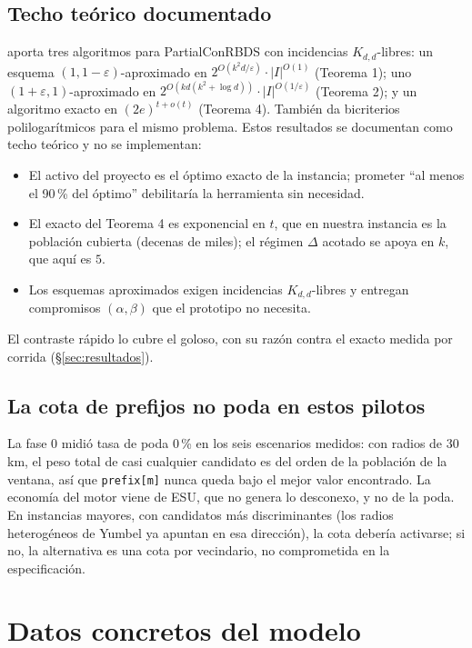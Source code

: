 \documentclass[12pt,letterpaper]{article}
\begin{document}
\subsection{Techo teórico documentado}
\label{sec:techo}
\cite{itcs2026} aporta tres algoritmos para PartialConRBDS con incidencias $K_{d,d}$-libres: un esquema $(1, 1-\varepsilon)$-aproximado en $2^{O(k^2 d/\varepsilon)} \cdot |I|^{O(1)}$ (Teorema 1); uno $(1+\varepsilon, 1)$-aproximado en $2^{O(kd(k^2+\log d))} \cdot |I|^{O(1/\varepsilon)}$ (Teorema 2); y un algoritmo exacto en $(2e)^{t+o(t)}$ (Teorema 4). También \cite{dangelo2025} da bicriterios polilogarítmicos para el mismo problema. Estos resultados se documentan como techo teórico y no se implementan:
\begin{itemize}
\item El activo del proyecto es el óptimo exacto de la instancia; prometer ``al menos el 90\,\% del óptimo'' debilitaría la herramienta sin necesidad.
\item El exacto del Teorema 4 es exponencial en $t$, que en nuestra instancia es la población cubierta (decenas de miles); el régimen $\Delta$ acotado se apoya en $k$, que aquí es $5$.
\item Los esquemas aproximados exigen incidencias $K_{d,d}$-libres y entregan compromisos $(\alpha, \beta)$ que el prototipo no necesita.
\end{itemize}
El contraste rápido lo cubre el goloso, con su razón contra el exacto medida por corrida (§\ref{sec:resultados}).

\subsection{La cota de prefijos no poda en estos pilotos}
La fase 0 midió tasa de poda $0$\,\% en los seis escenarios medidos: con radios de 30 km, el peso total de casi cualquier candidato es del orden de la población de la ventana, así que \texttt{prefix[m]} nunca queda bajo el mejor valor encontrado. La economía del motor viene de ESU, que no genera lo desconexo, y no de la poda. En instancias mayores, con candidatos más discriminantes (los radios heterogéneos de Yumbel ya apuntan en esa dirección), la cota debería activarse; si no, la alternativa es una cota por vecindario, no comprometida en la especificación.

\section{Datos concretos del modelo}
\label{sec:datos}
\end{document}
